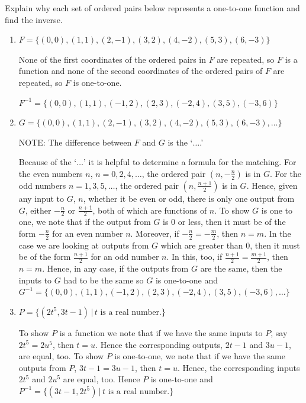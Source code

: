 \documentclass{ximera}
\begin{document}
\begin{problem}
Explain why each set of ordered pairs  below represents a  one-to-one function and find the inverse.

\begin{enumerate}
\item 
$F = \{ (0,0), (1,1), (2,-1), (3,2), (4,-2), (5,3), (6,-3)  \}$

\begin{solution}
None of the first coordinates of the ordered pairs in $F$ are repeated, so $F$ is a function and none of the second coordinates of the ordered pairs of $F$ are repeated, so $F$ is one-to-one.   

$F^{-1} = \{ (0,0), (1,1), (-1,2), (2,3), (-2,4), (3,5), (-3,6)  \}$
\end{solution}

\item
$G = \{ (0,0), (1,1), (2,-1), (3,2), (4,-2), (5,3), (6,-3), \ldots \}$  

NOTE:  The difference between $F$ and $G$ is the  `$\ldots$.'

\begin{solution}
Because of the `$\ldots$' it is helpful to determine a formula for the matching. For the even numbers $n$, $n = 0, 2, 4, \ldots$, the ordered pair $\left(n, -\frac{n}{2} \right)$ is in $G$.  For the odd numbers  $n = 1, 3, 5, \ldots$, the ordered pair $\left(n, \frac{n+1}{2} \right)$ is in $G$.  Hence, given any input to $G$, $n$, whether it be even or odd, there is only one output from $G$, either $-\frac{n}{2}$ or $\frac{n+1}{2}$, both of which are functions of $n$. To show $G$ is one to one, we note that if the output from $G$ is $0$ or less, then it must be of the form $-\frac{n}{2}$ for an even number $n$.  Moreover, if $-\frac{n}{2} = -\frac{m}{2}$, then $n = m$. In the case we are looking at outputs from $G$ which are greater than $0$, then it must be of the form $\frac{n+1}{2}$ for an odd number $n$.  In this, too, if  $\frac{n+1}{2} = \frac{m+1}{2}$, then $n = m$.  Hence, in any case, if the outputs from $G$ are the same, then the inputs to $G$ had to be the same so  $G$ is one-to-one and $G^{-1} = \{ (0,0), (1,1), (-1,2), (2,3), (-2,4), (3,5), (-3,6), \ldots \}$
\end{solution}

\item 
$P = \{ (2t^5, 3t-1) \, | \, \text{$t$ is a real number.} \}$

\begin{solution}
To show $P$ is a function we note that if we have the same inputs to $P$, say $2t^{5} = 2u^{5}$, then $t = u$.  Hence the corresponding outputs, $2t-1$ and $3u-1$, are equal, too. To show $P$ is one-to-one, we note that if we have the same outputs from $P$, $3t-1 = 3u-1$, then $t = u$.  Hence, the corresponding  inputs $2t^5$  and $2u^5$ are equal, too. Hence $P$ is one-to-one and $P^{-1} = \{ (3t-1, 2t^5) \, | \, \text{$t$ is a real number.} \}$
\end{solution}


\end{enumerate}
\end{problem}
\end{document}
